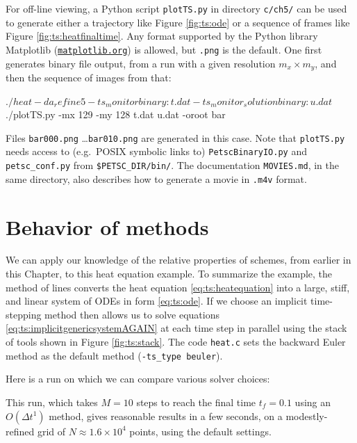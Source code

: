For off-line viewing, a Python script \texttt{plotTS.py} in directory \texttt{c/ch5/} can be used to generate either a trajectory like Figure \ref{fig:ts:ode} or a sequence of frames like Figure \ref{fig:ts:heatfinaltime}.  Any format supported by the Python library Matplotlib (\href{http://matplotlib.org/}{\texttt{matplotlib.org}}) is allowed, but \texttt{.png} is the default.  One first generates \PETSc binary file output, from a run with a given resolution $m_x \times m_y$, and then the sequence of images from that:
\begin{cline}
$ ./heat -da_refine 5 -ts_monitor binary:t.dat -ts_monitor_solution binary:u.dat
$ ./plotTS.py -mx 129 -my 128 t.dat u.dat -oroot bar
\end{cline}
Files \texttt{bar000.png} \dots \texttt{bar010.png} are generated in this case.  Note that \texttt{plotTS.py} needs access to (e.g.~POSIX symbolic links to) \texttt{PetscBinaryIO.py} and \texttt{petsc\_conf.py} from \texttt{\$PETSC\_DIR/bin/}.  The documentation \texttt{MOVIES.md}, in the same directory, also describes how to generate a movie in \texttt{.m4v} format.


\section{Behavior of methods}

We can apply our knowledge of the relative properties of schemes, from earlier in this Chapter, to this heat equation example.  To summarize the example, the method of lines converts the heat equation \eqref{eq:ts:heatequation} into a large, stiff, and linear system of ODEs in form \eqref{eq:ts:ode}.  If we choose an implicit time-stepping method then \PETSc allows us to solve equations \eqref{eq:ts:implicitgenericsystemAGAIN} at each time step in parallel using the stack of tools shown in Figure \ref{fig:ts:stack}.  The code \texttt{heat.c} sets the backward Euler method as the default method (\texttt{-ts\_type beuler}).

Here is a run on which we can compare various solver choices:
This run, which takes $M=10$ steps to reach the final time $t_f=0.1$ using an $O(\Delta t^1)$ method, gives reasonable results in a few seconds,  %
on a modestly-refined grid of $N  ^4$ points, using the default settings.

